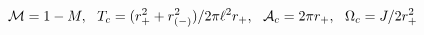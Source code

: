 \begin{equation}
{\cal M}=1-M,~~T_c = (r_+^2 + r_{(-)}^2) / 2 \pi \ell^2 r_+,
~~{\cal A}_c = 2 \pi r_+,
~~\Omega_c = J / 2 r_+^2
\label{temp}
\end{equation}

